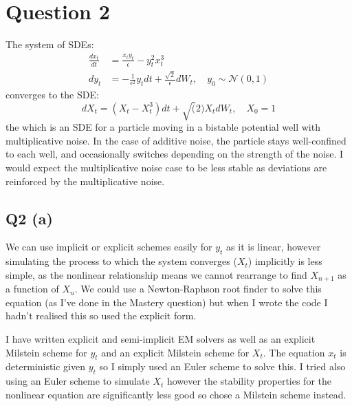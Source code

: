 \documentclass[11pt]{article} %
\begin{document}
\section{Question 2}
The system of SDEs:
\begin{align}
	\frac{dx_{t}}{dt} &= \frac{x_{t}y_{t}}{\epsilon} - y_{t}^{2}x_{t}^{3}\\
	dy_{t} &= -\frac{1}{\epsilon^{2}}y_{t}dt + \frac{\sqrt{2}}{\epsilon}dW_{t}, \quad y_{0}\sim\mathcal{N}(0,1)
\end{align}
converges to the SDE:
\[
	dX_{t} = (X_{t} - X_{t}^{3})dt + \sqrt(2)X_{t}dW_{t},\quad X_{0} = 1
\] the 
which is an SDE for a particle moving in a bistable potential well with multiplicative noise. In the case of additive noise, the particle stays well-confined to each well, and occasionally switches depending on the strength of the noise. I would expect the multiplicative noise case to be less stable as deviations are reinforced by the multiplicative noise.
\subsection{Q2 (a)}
We can use implicit or explicit schemes easily for $y_{t}$ as it is linear, however simulating the process to which the system converges  ($X_{t}$) implicitly is less simple, as the nonlinear relationship means we cannot rearrange to find $X_{n+1}$ as a function of $X_{n}$. We could use a Newton-Raphson root finder to solve this equation (as I've done in the Mastery question) but when I wrote the code I hadn't realised this so used the explicit form.


I have written explicit and semi-implicit EM solvers as well as an explicit Milstein scheme for $y_{t}$ and an explicit Milstein scheme for $X_{t}$. The equation $x_{t}$ is deterministic given $y_{t}$ so I simply used an Euler scheme to solve this. I tried also using an Euler scheme to simulate $X_{t}$ however the stability properties for the nonlinear equation are significantly less good so chose a Milstein scheme instead.
\end{document}
